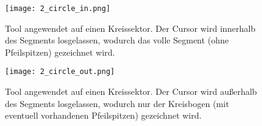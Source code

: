 \begin{figure}[htbp]
  \begin{center}
  \texttt{[image: 2\_circle\_in.png]}
  \end{center}
  \caption{Tool  angewendet auf einen Kreissektor. Der Cursor wird
   innerhalb des Segments losgelassen, wodurch das volle Segment (ohne
   Pfeilspitzen) gezeichnet wird.}
  \label{fig:circlein}
\end{figure}


\begin{figure}[htbp]
  \begin{center}
  \texttt{[image: 2\_circle\_out.png]}
  \end{center}
  \caption{Tool  angewendet auf einen Kreissektor. Der Cursor wird
   außerhalb des Segments losgelassen, wodurch nur der Kreisbogen (mit
   eventuell vorhandenen Pfeilspitzen) gezeichnet wird.}
  \label{fig:circleout}
\end{figure}

